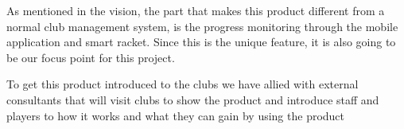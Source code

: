 As mentioned in the vision, the part that makes this product different from a normal club management system, is the progress monitoring through the mobile application and smart racket. Since this is the unique feature, it is also going to be our focus point for this project.

To get this product introduced to the clubs we have allied with external consultants that will visit clubs to show the product and introduce staff and players to how it works and what they can gain by using the product
